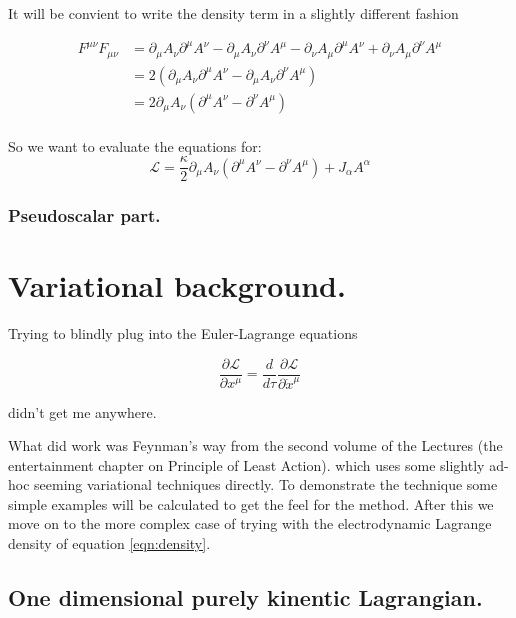 \documentclass{article}
\newcommand{\LL}[0]{\mathcal{L}}
\newcommand{\PD}[2]{\frac{\partial {#2}}{\partial {#1}}}
\begin{document}
It will be convient to write the density term in a slightly different fashion

\begin{align*}
F^{\mu\nu} F_{\mu\nu}
&=
\partial_{\mu} A_{\nu} \partial^{\mu} A^{\nu}
-\partial_{\mu} A_{\nu} \partial^{\nu} A^{\mu}
-\partial_{\nu} A_{\mu} \partial^{\mu} A^{\nu}
+\partial_{\nu} A_{\mu} \partial^{\nu} A^{\mu} \\
&= 2 \left( \partial_{\mu} A_{\nu} \partial^{\mu} A^{\nu} -\partial_{\mu} A_{\nu} \partial^{\nu} A^{\mu} \right) \\
&= 2 \partial_{\mu} A_{\nu} \left( \partial^{\mu} A^{\nu} -\partial^{\nu} A^{\mu} \right) \\
\end{align*}

So we want to evaluate the equations for:
\begin{equation}\label{eqn:density}
\LL = \frac{\kappa}{2} \partial_{\mu} A_{\nu} ( \partial^{\mu} A^{\nu} - \partial^{\nu} A^{\mu} ) + J_{\alpha} A^{\alpha}
\end{equation}

\subsubsection{ Pseudoscalar part. }



\section{ Variational background. }

Trying to blindly plug into the Euler-Lagrange equations

\begin{equation*}
\PD{x^\mu}{\LL} = \frac{d}{d\tau} \PD{\dot{x}^\mu}{\LL}
\end{equation*}

didn't get me anywhere.

What did work was Feynman's way from the second volume of the Lectures (the entertainment chapter on Principle of Least Action).
which uses some slightly ad-hoc seeming variational techniques directly.  To demonstrate the technique some simple examples
will be calculated to get the feel for the method.  After this we move on to the more complex case of trying with the electrodynamic Lagrange
density of equation \ref{eqn:density}.

\subsection{ One dimensional purely kinentic Lagrangian. }
\end{document}
